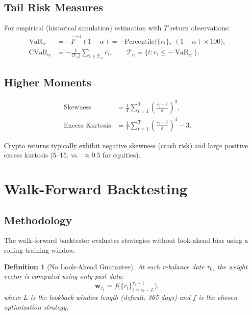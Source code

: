 \documentclass[12pt,a4paper]{article}
\newtheorem{definition}{Definition}[section]
\DeclareMathOperator{\CVaR}{CVaR}
\DeclareMathOperator{\VaR}{VaR}
\begin{document}
\subsection{Tail Risk Measures}

For empirical (historical simulation) estimation with $T$ return observations:
\begin{align}
    \VaR_\alpha &= -\hat{F}^{-1}(1 - \alpha) = -\text{Percentile}\bigl(\{r_t\},\; (1-\alpha) \times 100\bigr),
    \label{eq:var-hist} \\
    \CVaR_\alpha &= -\frac{1}{|\mathcal{T}_\alpha|} \sum_{t \in \mathcal{T}_\alpha} r_t,
    \qquad \mathcal{T}_\alpha = \{t : r_t \leq -\VaR_\alpha\}.
    \label{eq:cvar-hist}
\end{align}

\subsection{Higher Moments}

\begin{align}
    \text{Skewness} &= \frac{1}{T} \sum_{t=1}^{T} \left(\frac{r_t - \bar{r}}{\hat{\sigma}}\right)^3,
    \label{eq:skewness} \\
    \text{Excess Kurtosis} &= \frac{1}{T} \sum_{t=1}^{T} \left(\frac{r_t - \bar{r}}{\hat{\sigma}}\right)^4 - 3.
    \label{eq:kurtosis}
\end{align}

Crypto returns typically exhibit negative skewness (crash risk) and large positive excess kurtosis ($5$--$15$, vs.\ $\approx 0.5$ for equities).

\section{Walk-Forward Backtesting}
\label{sec:backtest}

\subsection{Methodology}

The walk-forward backtester evaluates strategies without look-ahead bias using a rolling training window.

\begin{definition}[No Look-Ahead Guarantee]
At each rebalance date $\tau_k$, the weight vector is computed using only past data:
\begin{equation}
    \bm{w}_{\tau_k} = f\bigl(\{r_t\}_{t=\tau_k - L}^{\tau_k - 1}\bigr),
    \label{eq:no-lookahead}
\end{equation}
where $L$ is the lookback window length (default: 365 days) and $f$ is the chosen optimization strategy.
\end{definition}
\end{document}
